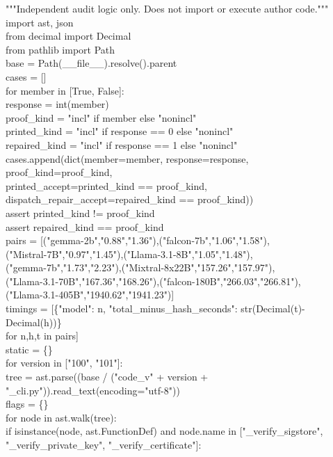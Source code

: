 \documentclass[10pt]{article}
\begin{document}
{\ttfamily\footnotesize """Independent audit logic only. Does not import or execute author code."""\\
import ast, json\\
from decimal import Decimal\\
from pathlib import Path\\
base = Path(\_\_file\_\_).resolve().parent\\
cases = []\\
for member in [True, False]:\\
    response = int(member)\\
    proof\_kind = "incl" if member else "nonincl"\\
    printed\_kind = "incl" if response == 0 else "nonincl"\\
    repaired\_kind = "incl" if response == 1 else "nonincl"\\
    cases.append(dict(member=member, response=response, proof\_kind=proof\_kind,\\
                      printed\_accept=printed\_kind == proof\_kind,\\
                      dispatch\_repair\_accept=repaired\_kind == proof\_kind))\\
    assert printed\_kind != proof\_kind\\
    assert repaired\_kind == proof\_kind\\
pairs = [("gemma-2b","0.88","1.36"),("falcon-7b","1.06","1.58"),\\
         ("Mistral-7B","0.97","1.45"),("Llama-3.1-8B","1.05","1.48"),\\
         ("gemma-7b","1.73","2.23"),("Mixtral-8x22B","157.26","157.97"),\\
         ("Llama-3.1-70B","167.36","168.26"),("falcon-180B","266.03","266.81"),\\
         ("Llama-3.1-405B","1940.62","1941.23")]\\
timings = [\{"model": n, "total\_minus\_hash\_seconds": str(Decimal(t)-Decimal(h))\}\\
           for n,h,t in pairs]\\
static = \{\}\\
for version in ["100", "101"]:\\
    tree = ast.parse((base / ("code\_v" + version + "\_cli.py")).read\_text(encoding="utf-8"))\\
    flags = \{\}\\
    for node in ast.walk(tree):\\
        if isinstance(node, ast.FunctionDef) and node.name in ["\_verify\_sigstore", "\_verify\_private\_key", "\_verify\_certificate"]:\\
}
\end{document}
